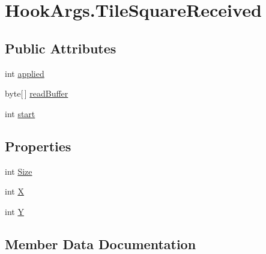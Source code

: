 \hypertarget{structOTA_1_1Plugin_1_1HookArgs_1_1TileSquareReceived}{}\section{Hook\+Args.\+Tile\+Square\+Received}
\label{structOTA_1_1Plugin_1_1HookArgs_1_1TileSquareReceived}
\subsection*{Public Attributes}
\begin{DoxyCompactItemize}
\item 
int \hyperlink{structOTA_1_1Plugin_1_1HookArgs_1_1TileSquareReceived_aba48763d25b8ce31d1f5455410975202}{applied}
\item 
byte\mbox{[}$\,$\mbox{]} \hyperlink{structOTA_1_1Plugin_1_1HookArgs_1_1TileSquareReceived_a02e5ae285147d96e09d37f1b7562ae66}{read\+Buffer}
\item 
int \hyperlink{structOTA_1_1Plugin_1_1HookArgs_1_1TileSquareReceived_a37722a150250e2a5a98e5e0d11e53449}{start}
\end{DoxyCompactItemize}
\subsection*{Properties}
\begin{DoxyCompactItemize}
\item 
int \hyperlink{structOTA_1_1Plugin_1_1HookArgs_1_1TileSquareReceived_af06eb7b9b70be91dadd4f12ebcaed796}{Size}
\item 
int \hyperlink{structOTA_1_1Plugin_1_1HookArgs_1_1TileSquareReceived_a80c0944640e62d3ed6c5419c1bcc0c88}{X}
\item 
int \hyperlink{structOTA_1_1Plugin_1_1HookArgs_1_1TileSquareReceived_aa482c4cc86a24474e4fb19b5b5978778}{Y}
\end{DoxyCompactItemize}


\subsection{Member Data Documentation}
\hypertarget{structOTA_1_1Plugin_1_1HookArgs_1_1TileSquareReceived_aba48763d25b8ce31d1f5455410975202}{}
